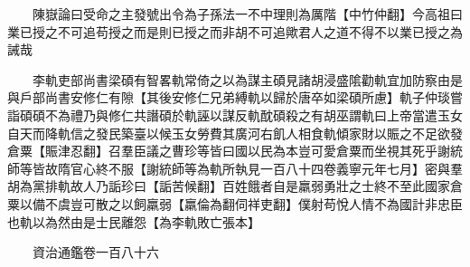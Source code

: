 　　陳嶽論曰受命之主發號出令為子孫法一不中理則為厲階【中竹仲翻】今高祖曰業已授之不可追苟授之而是則已授之而非胡不可追歟君人之道不得不以業已授之為誡哉

　　李軌吏部尚書梁碩有智畧軌常倚之以為謀主碩見諸胡浸盛隂勸軌宜加防察由是與戶部尚書安修仁有隙【其後安修仁兄弟縛軌以歸於唐卒如梁碩所慮】軌子仲琰嘗詣碩碩不為禮乃與修仁共譖碩於軌誣以謀反軌酖碩殺之有胡巫謂軌曰上帝當遣玉女自天而降軌信之發民築臺以候玉女勞費其廣河右飢人相食軌傾家財以賑之不足欲發倉粟【賑津忍翻】召羣臣議之曹珍等皆曰國以民為本豈可愛倉粟而坐視其死乎謝統師等皆故隋官心終不服【謝統師等為軌所執見一百八十四卷義寧元年七月】密與羣胡為黨排軌故人乃詬珍曰【詬苦候翻】百姓餓者自是羸弱勇壯之士終不至此國家倉粟以備不虞豈可散之以飼羸弱【羸倫為翻伺祥吏翻】僕射苟悅人情不為國計非忠臣也軌以為然由是士民離怨【為李軌敗亡張本】

　　資治通鑑卷一百八十六  
    


 


 



 

 
  







 


　　
　　
　
　
　


　　

　















	
	









































